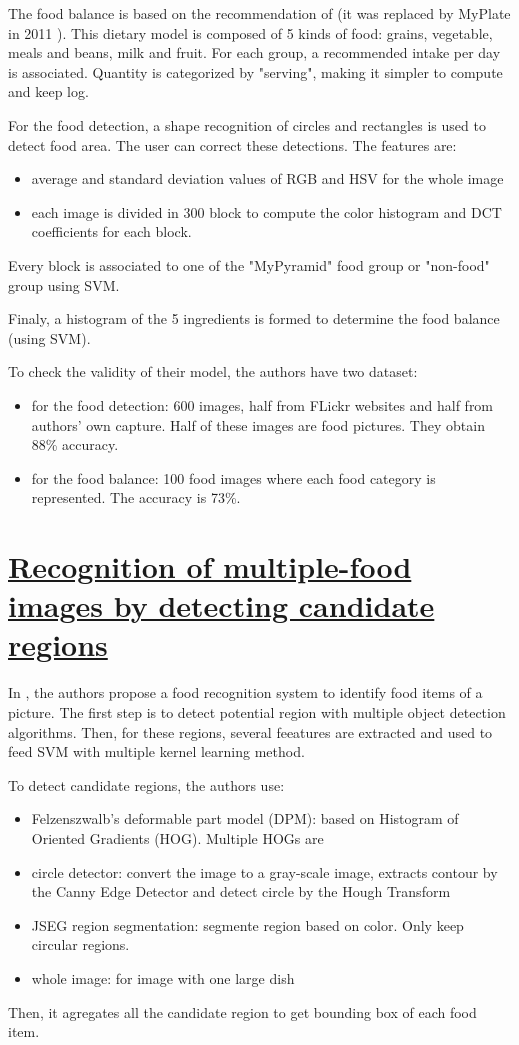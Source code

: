 The food balance is based on the recommendation of \cite{MyPyramid} (it was replaced by MyPlate in 2011 \cite{MyPlate}). This dietary model is composed of 5 kinds of food: grains, vegetable, meals and beans, milk and fruit. For each group, a recommended intake per day is associated. Quantity is categorized by "serving", making it simpler to compute and keep log.

For the food detection, a shape recognition of circles and rectangles is used to detect food area. The user can correct these detections.
The features are:
\begin{itemize}
    \item average and standard deviation values of RGB and HSV for the whole image
    \item each image is divided in 300 block to compute the color histogram and DCT coefficients for each block. 
\end{itemize}
Every block is associated to one of the "MyPyramid" food group or "non-food" group using SVM.

Finaly, a histogram of the 5 ingredients is formed to determine the food balance (using SVM).

To check the validity of their model, the authors have two dataset:
\begin{itemize}
    \item for the food detection: 600 images, half from FLickr websites and half from authors' own capture. Half of these images are food pictures. They obtain 88\% accuracy.
    \item for the food balance: 100 food images where each food category is represented. The accuracy is 73\%.
\end{itemize}

\section{\href{http://ieeexplore.ieee.org/lpdocs/epic03/wrapper.htm?arnumber=6298369}{Recognition of multiple-food images by detecting candidate regions}}

In \cite{Matsuda2012a}, the authors propose a food recognition system to identify food items of a picture. The first step is to detect potential region with multiple object detection algorithms. Then, for these regions, several feeatures are extracted and used to feed SVM with multiple kernel learning method.

To detect candidate regions, the authors use:
\begin{itemize}
    \item Felzenszwalb’s deformable part model (DPM): based on Histogram of Oriented Gradients (HOG). Multiple HOGs are
    \item circle detector: convert the image to a gray-scale image, extracts contour by the Canny Edge Detector and detect circle by the Hough Transform
    \item JSEG region segmentation: segmente region based on color. Only keep circular regions.
    \item whole image: for image with one large dish
\end{itemize}
Then, it agregates all the candidate region to get bounding box of each food item.

